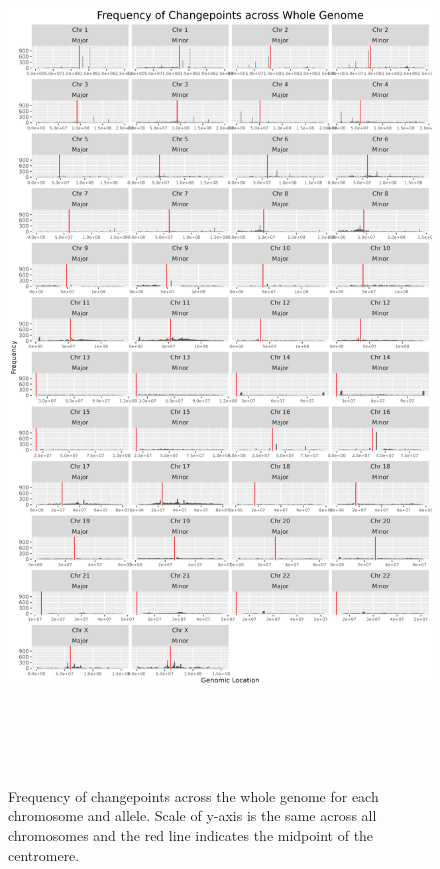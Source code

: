 \begin{figure}[H]
\centering
\includegraphics[width = 1\textwidth, height = 23cm]{../figures/Chapter_6/Scaled_Frequency_Genomic_Seg.png}
\caption[Frequency of changepoints across the whole genome for each chromosome and allele.]{Frequency of changepoints across the whole genome for each chromosome and allele. Scale of y-axis is the same across all chromosomes and the red line indicates the midpoint of the centromere.}
\label{fig:Histogram_Total}
\end{figure}

